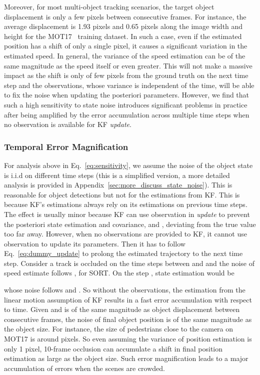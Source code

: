\documentclass[10pt,twocolumn,letterpaper]{article}
\begin{document}
Moreover, for most multi-object tracking scenarios, the target object displacement is only a few pixels between consecutive frames. For instance, the average displacement is 1.93 pixels and 0.65 pixels along the image width and height for the MOT17~\cite{milan2016mot16} training dataset. 
In such a case, even if the estimated position has a shift of only a single pixel, it causes a significant variation in the estimated speed.
In general, the variance of the speed estimation can be of the same magnitude as the speed itself or even greater.
This will not make a massive impact as the shift is only of few pixels from the ground truth on the next time step and the observations, whose variance is independent of the time, will be able to fix the noise when updating the posteriori parameters. 
However, we find that such a high sensitivity to state noise introduces significant problems in practice after being amplified by the  error accumulation across multiple time steps when no observation is available for KF \textit{update}.

\vspace{-0.4cm}
\subsubsection{Temporal Error Magnification} 
For analysis above in Eq.~\ref{eq:sensitivity}, we assume the noise of the object state is i.i.d on different time steps (this is a simplified version, a more detailed analysis is provided in Appendix~\ref{sec:more_discuss_state_noise}). This is reasonable for object detections but not for the estimations from KF. This is because KF's estimations always rely on its estimations on previous time steps. The effect is usually minor because KF can use observation in \textit{update} to prevent the posteriori state estimation and covariance, \ie  and , deviating from the true value too far away.
However, when no observations are provided to KF, it cannot use observation to update its parameters. Then it has to follow Eq.~\ref{eq:dummy_update} to prolong the estimated trajectory to the next time step.
Consider a track is occluded on the time steps between  and  and the noise of speed estimate follows ,  for SORT. On the step , state estimation would be 

whose noise follows  and . So without the observations, the estimation from the linear motion assumption of KF results in a fast error accumulation with respect to time. Given  and  is of the same magnitude as object displacement between consecutive frames,  the noise of final object position  is of the same magnitude as the object size. For instance, the size of pedestrians close to the camera on MOT17 is around  pixels. So even assuming the variance of position estimation is only 1 pixel, 10-frame occlusion can accumulate a shift in final position estimation as large as the object size. Such error magnification leads to a major accumulation of errors when the scenes are crowded.
\end{document}
